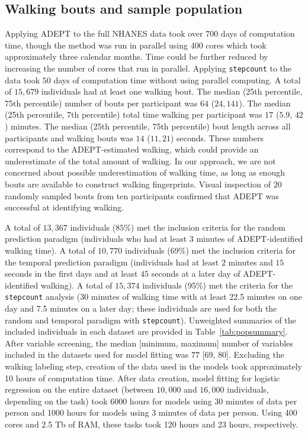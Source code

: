 \subsection{Walking bouts and sample population}
Applying ADEPT to the full NHANES data took over $700$ days of computation time, though the method was run in parallel using 400 cores which took approximately three calendar months. Time could be further reduced by increasing the number of cores that run in parallel. Applying \texttt{stepcount} to the data took $50$ days of computation time without using parallel computing.
A total of $15{,}679$ individuals had at least one walking bout. The median (25th percentile, 75th percentile) number of bouts per participant was $64$ ($24, 141$). The median (25th percentile, 7th percentile) total time walking per participant was $17$ ($5.9$, $42$) minutes. The median (25th percentile, 75th percentile) bout length across all participants and walking bouts was $14$ ($11, 21$) seconds. These numbers correspond to the ADEPT-estimated walking, which could provide an underestimate of the total amount of walking. In our approach, we are not concerned about possible underestimation of walking time, as long as enough bouts are available to construct walking fingerprints. Visual inspection of $20$ randomly sampled bouts from ten participants confirmed that ADEPT was successful at identifying walking.

A total of $13{,}367$ individuals ($85$\%) met the inclusion criteria for the random prediction paradigm (individuals who had at least $3$ minutes of ADEPT-identified walking time). A total of $10{,}770$ individuals ($69$\%) met the inclusion criteria for the temporal prediction paradigm (individuals had at least $2$ minutes and $15$ seconds in the first days and at least $45$ seconds at a later day of ADEPT-identified walking). A total of $15{,}374$ individuals (95\%) met the criteria for the \texttt{stepcount} analysis (30 minutes of walking time with at least 22.5 minutes on one day and 7.5 minutes on a later day; these individuals are used for both the random and temporal paradigm with \texttt{stepcount}). Unweighted summaries of the included individuals in each dataset are provided in Table~\ref{tab:popsummary}. After variable screening, the median [minimum, maximum] number of variables included in the datasets used for model fitting was $77$ [69, 80]. Excluding the walking labeling step, creation of the data used in the models took approximately 10 hours of computation time. After data creation, model fitting for logistic regression on the entire dataset (between $10{,}000$ and $16{,}000$ individuals, depending on the task) took 6000 hours for models using 30 minutes of data per person and 1000 hours for models using 3 minutes of data per person. Using 400 cores and 2.5 Tb of RAM, these tasks took 120 hours and 23 hours, respectively.

